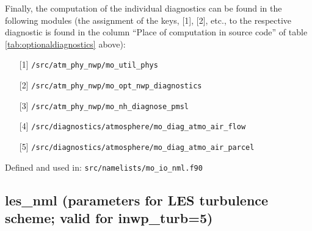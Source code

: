 Finally, the computation of the individual diagnostics can be found 
in the following modules 
(the assignment of the keys, {[1]}, {[2]}, etc., to the respective diagnostic 
is found in the column ``Place of computation in source code'' of table \ref{tab:optionaldiagnostics} above):
%
\begin{itemize}
\setlength\itemsep{-0.3em}
\item[{[1]}] \texttt{/src/atm\_phy\_nwp/mo\_util\_phys}
\item[{[2]}] \texttt{/src/atm\_phy\_nwp/mo\_opt\_nwp\_diagnostics}
\item[{[3]}] \texttt{/src/atm\_phy\_nwp/mo\_nh\_diagnose\_pmsl} 
\item[{[4]}] \texttt{/src/diagnostics/atmosphere/mo\_diag\_atmo\_air\_flow} 
\item[{[5]}] \texttt{/src/diagnostics/atmosphere/mo\_diag\_atmo\_air\_parcel}
\end{itemize}
%

Defined and used in: \verb+src/namelists/mo_io_nml.f90+


\subsection{les\_nml (parameters for LES turbulence scheme; valid for inwp\_turb=5)}

